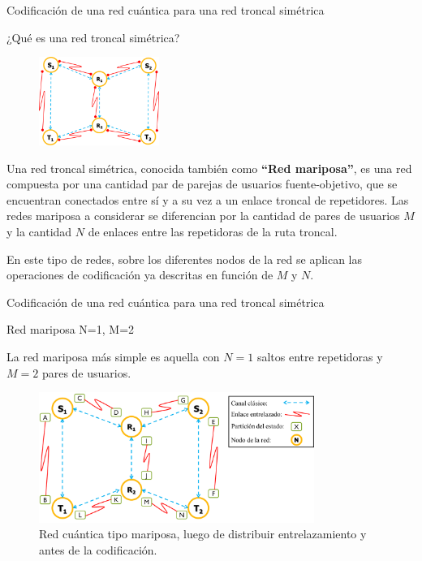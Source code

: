 \documentclass[10pt]{beamer}
\renewenvironment{block}[1]
    {\begin{oldblock}{#1}
        \smallskip
    }
    {
    \end{oldblock}
    }
\begin{document}
\begin{frame}{Codificación de una red cuántica para una red troncal simétrica}

  \begin{block}{¿Qué es una red troncal simétrica?}
    \begin{figure}
      \vspace{-15pt}
      \begin{center}
        \includegraphics[width=0.35\textwidth]{butterflyquantum.png}
      \end{center}
      \vspace{-15pt}
    \end{figure}
    Una red troncal simétrica, conocida también como \textbf{``Red mariposa''}, es una red compuesta por una cantidad par de parejas de usuarios fuente-objetivo, que se encuentran conectados entre sí y a su vez a un enlace troncal de repetidores. Las redes mariposa a considerar se diferencian por la cantidad de pares de usuarios $M$ y la cantidad $N$ de enlaces entre las repetidoras de la ruta troncal. \par
    En este tipo de redes, sobre los diferentes nodos de la red se aplican las operaciones de codificación ya descritas en función de $M$ y $N$.
  \end{block}
\end{frame}

\begin{frame}{Codificación de una red cuántica para una red troncal simétrica}
  \begin{block}{Red mariposa N=1, M=2}
    La red mariposa más simple es aquella con $N=1$ saltos entre repetidoras y $M=2$ pares de usuarios.
    \begin{figure}
      \includegraphics[width=0.8\textwidth]{butterflyquantum2.png}
      \caption{Red cuántica tipo mariposa, luego de distribuir entrelazamiento y antes de la codificación.}
      \label{fig:butterfly2}
    \end{figure}%
  \end{block}

\end{frame}
\end{document}
